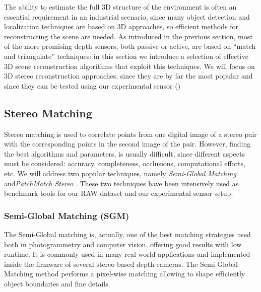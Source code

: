 The ability to estimate the full 3D structure of the environment is often an essential requirement in an industrial scenario, since many object detection and localization techniques are based on 3D approaches, so efficient methods for reconstructing the scene are needed. As introduced in the previous section, most of the more promising depth sensors, both passive or active, are based on ``match and triangulate'' techniques: in this section we introduce a selection of effective 3D scene reconstruction algorithms that exploit this techniques. We will focus on 3D stereo reconstruction approaches, since they are by far the most popular and since they can be tested using our experimental sensor ()

\subsection{Stereo Matching}\label{subsec:stereomatching}
Stereo matching is used to correlate points from one digital image of a stereo pair with the corresponding points in the second image of the pair. However, finding the best algorithms and parameters, is usually difficult, since different aspects must be considered: accuracy, completeness, occlusions, computational efforts, etc. 
We will address two popular techniques, namely \emph{Semi-Global Matching} \cite{hirschmuller2005SemiGlobal} and\emph{PatchMatch Stereo} \cite{bleyer2011PatchMatchStereo}. These two techniques have been intensively used as benchmark tools for our RAW dataset and our experimental sensor setup.


\subsubsection{Semi-Global Matching (SGM)}\label{subsec:semiglobalmatching}
The Semi-Global matching is, actually, one of the best matching strategies used both in photogrammetry and computer vision, offering good results with low runtime. It is commonly used in many real-world applications and implemented inside the firmware of several stereo based depth-cameras. The Semi-Global Matching method \cite{hirschmuller2005SemiGlobal} performs a pixel-wise matching allowing to shape efficiently object boundaries and fine details. 

